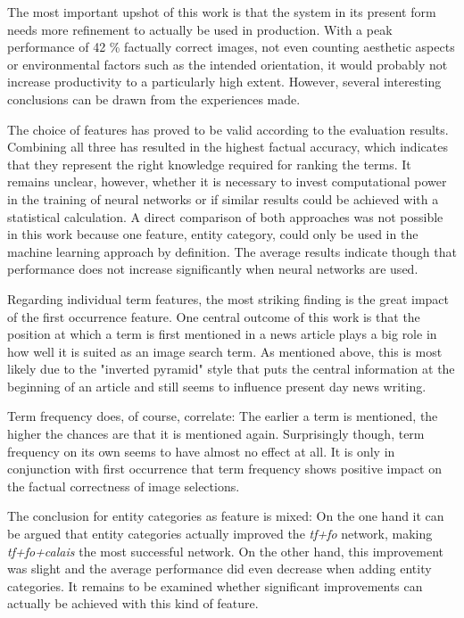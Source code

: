 \documentclass[11pt,a4paper,twoside]{article}
\begin{document}
The most important upshot of this work is that the system in its present form needs more refinement to actually be used in production. With a peak performance of 42 \% factually correct images, not even counting aesthetic aspects or environmental factors such as the intended orientation, it would probably not increase productivity to a particularly high extent. However, several interesting conclusions can be drawn from the experiences made.

The choice of features has proved to be valid according to the evaluation results. Combining all three has resulted in the highest factual accuracy, which indicates that they represent the right knowledge required for ranking the terms. It remains unclear, however, whether it is necessary to invest computational power in the training of neural networks or if similar results could be achieved with a statistical calculation. A direct comparison of both approaches was not possible in this work because one feature, entity category, could only be used in the machine learning approach by definition. The average results indicate though that performance does not increase significantly when neural networks are used.

Regarding individual term features, the most striking finding is the great impact of the first occurrence feature. One central outcome of this work is that the position at which a term is first mentioned in a news article plays a big role in how well it is suited as an image search term. As mentioned above, this is most likely due to the "inverted pyramid" style that puts the central information at the beginning of an article and still seems to influence present day news writing.

Term frequency does, of course, correlate: The earlier a term is mentioned, the higher the chances are that it is mentioned again. Surprisingly though, term frequency on its own seems to have almost no effect at all. It is only in conjunction with first occurrence that term frequency shows positive impact on the factual correctness of image selections.

The conclusion for entity categories as feature is mixed: On the one hand it can be argued that entity categories actually improved the \emph{tf+fo} network, making \emph{tf+fo+calais} the most successful network. On the other hand, this improvement was slight and the average performance did even decrease when adding entity categories. It remains to be examined whether significant improvements can actually be achieved with this kind of feature.
\end{document}
